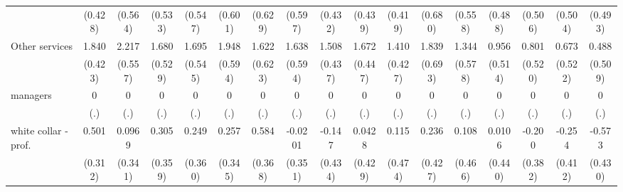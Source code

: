 {\begin{tabular}{l*{16}{c}}
                    &     (0.428)         &     (0.564)         &     (0.533)         &     (0.547)         &     (0.601)         &     (0.629)         &     (0.597)         &     (0.432)         &     (0.439)         &     (0.419)         &     (0.680)         &     (0.558)         &     (0.488)         &     (0.506)         &     (0.504)         &     (0.493)         \\
[1em]
Other services      &       1.840\sym{***}&       2.217\sym{***}&       1.680\sym{**} &       1.695\sym{**} &       1.948\sym{**} &       1.622\sym{**} &       1.638\sym{**} &       1.508\sym{***}&       1.672\sym{***}&       1.410\sym{***}&       1.839\sym{**} &       1.344\sym{*}  &       0.956         &       0.801         &       0.673         &       0.488         \\
                    &     (0.423)         &     (0.557)         &     (0.529)         &     (0.545)         &     (0.594)         &     (0.623)         &     (0.594)         &     (0.437)         &     (0.447)         &     (0.427)         &     (0.693)         &     (0.578)         &     (0.514)         &     (0.520)         &     (0.522)         &     (0.509)         \\
[1em]
managers            &           0         &           0         &           0         &           0         &           0         &           0         &           0         &           0         &           0         &           0         &           0         &           0         &           0         &           0         &           0         &           0         \\
                    &         (.)         &         (.)         &         (.)         &         (.)         &         (.)         &         (.)         &         (.)         &         (.)         &         (.)         &         (.)         &         (.)         &         (.)         &         (.)         &         (.)         &         (.)         &         (.)         \\
[1em]
white collar - prof.&       0.501         &      0.0969         &       0.305         &       0.249         &       0.257         &       0.584         &     -0.0201         &      -0.147         &      0.0428         &       0.115         &       0.236         &       0.108         &      0.0106         &      -0.200         &      -0.254         &      -0.573         \\
                    &     (0.312)         &     (0.341)         &     (0.359)         &     (0.360)         &     (0.345)         &     (0.368)         &     (0.351)         &     (0.434)         &     (0.429)         &     (0.474)         &     (0.427)         &     (0.466)         &     (0.440)         &     (0.382)         &     (0.412)         &     (0.430)         \\

\end{tabular}}
